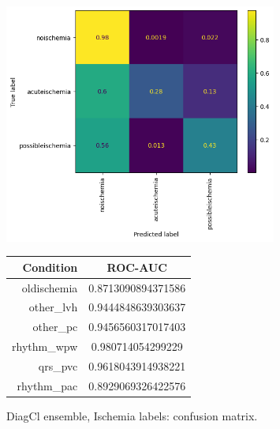 \documentclass[a4paper,10pt]{article}
\begin{document}
\begin{figure}[p]
	\centering
	\begin{minipage}{\textwidth}
		\centering
		\includegraphics[width=0.8\textwidth]{diagcl_ischemia_cm.png}
		\caption{DiagCl ensemble, Ischemia labels: confusion matrix.}
		\label{fig:diagcl_ischemia_cm}
	\end{minipage}
	\baselineskip
	\begin{tabular}{r|c}
		\textbf{Condition} & \textbf{ROC-AUC}   \\ \midrule
		oldischemia        & 0.8713090894371586 \\
		other\_lvh         & 0.9444848639303637 \\
		other\_pc          & 0.9456560317017403 \\
		rhythm\_wpw        & 0.980714054299229  \\
		qrs\_pvc           & 0.9618043914938221 \\
		rhythm\_pac        & 0.8929069326422576
	\end{tabular}
	\label{tab:diag_other_roc-auc}
\end{figure}
\end{document}
